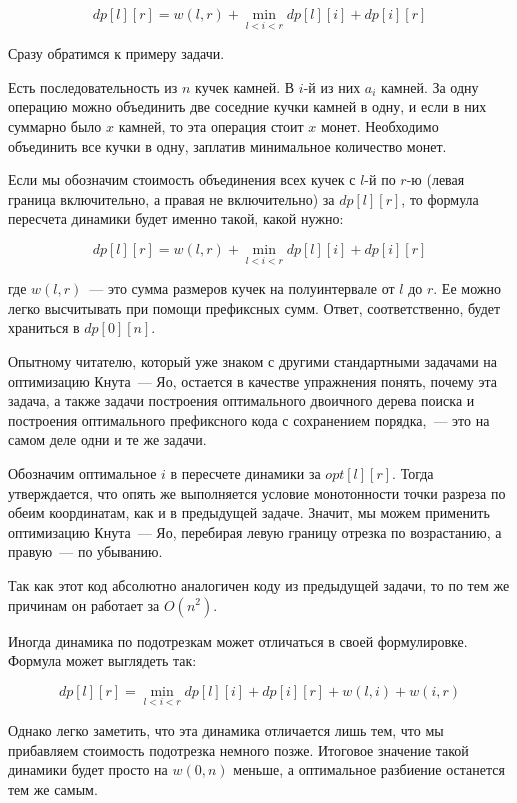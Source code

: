 $$dp[l][r] = w(l, r) + \min_{l < i < r} dp[l][i] + dp[i][r]$$

Сразу обратимся к примеру задачи.

\begin{problem}
Есть последовательность из $n$ кучек камней. В $i$-й из них $a_i$ камней. За одну операцию можно объединить две соседние кучки камней в одну, и если в них суммарно было $x$ камней, то эта операция стоит $x$ монет. Необходимо объединить все кучки в одну, заплатив минимальное количество монет.
\end{problem}

Если мы обозначим стоимость объединения всех кучек с $l$-й по $r$-ю (левая граница включительно, а правая не включительно) за $dp[l][r]$, то формула пересчета динамики будет именно такой, какой нужно:

$$dp[l][r] = w(l, r) + \min_{l < i < r} dp[l][i] + dp[i][r]$$

где $w(l, r)$~--- это сумма размеров кучек на полуинтервале от $l$ до $r$. Ее можно легко высчитывать при помощи префиксных сумм. Ответ, соответственно, будет храниться в $dp[0][n]$.

\begin{exercise}
    Опытному читателю, который уже знаком с другими стандартными задачами на оптимизацию Кнута~--- Яо, остается в качестве упражнения понять, почему эта задача, а также задачи построения оптимального двоичного дерева поиска и построения оптимального префиксного кода с сохранением порядка,~--- это на самом деле одни и те же задачи.
\end{exercise}

Обозначим оптимальное $i$ в пересчете динамики за $opt[l][r]$. Тогда утверждается, что опять же выполняется условие монотонности точки разреза по обеим координатам, как и в предыдущей задаче. Значит, мы можем применить оптимизацию Кнута~--- Яо, перебирая левую границу отрезка по возрастанию, а правую~--- по убыванию.



Так как этот код абсолютно аналогичен коду из предыдущей задачи, то по тем же причинам он работает за $O(n^2)$.

\begin{observation}
    Иногда динамика по подотрезкам может отличаться в своей формулировке. Формула может выглядеть так:

    $$dp[l][r] = \min_{l < i < r} dp[l][i] + dp[i][r] + w(l, i) + w(i, r)$$

    Однако легко заметить, что эта динамика отличается лишь тем, что мы прибавляем стоимость подотрезка немного позже. Итоговое значение такой динамики будет просто на $w(0, n)$ меньше, а оптимальное разбиение останется тем же самым.
\end{observation}

